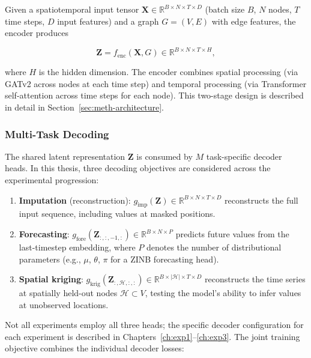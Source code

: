 Given a spatiotemporal input tensor $\mathbf{X} \in \mathbb{R}^{B \times N \times T \times D}$ (batch size $B$, $N$ nodes, $T$ time steps, $D$ input features) and a graph $G = (V, E)$ with edge features, the encoder produces

\begin{equation}
    \mathbf{Z} = f_{\text{enc}}(\mathbf{X}, G) \in \mathbb{R}^{B \times N \times T \times H},
    \label{eq:encoder-latent}
\end{equation}

\noindent where $H$ is the hidden dimension. The encoder combines spatial processing (via GATv2 across nodes at each time step) and temporal processing (via Transformer self-attention across time steps for each node). This two-stage design is described in detail in Section~\ref{sec:meth-architecture}.

\subsubsection{Multi-Task Decoding}

The shared latent representation $\mathbf{Z}$ is consumed by $M$ task-specific decoder heads. In this thesis, three decoding objectives are considered across the experimental progression:

\begin{enumerate}
    \item \textbf{Imputation} (reconstruction): $g_{\text{imp}}(\mathbf{Z}) \in \mathbb{R}^{B \times N \times T \times D}$ reconstructs the full input sequence, including values at masked positions.
    \item \textbf{Forecasting}: $g_{\text{fore}}(\mathbf{Z}_{:,:,-1,:}) \in \mathbb{R}^{B \times N \times P}$ predicts future values from the last-timestep embedding, where $P$ denotes the number of distributional parameters (e.g., $\mu$, $\theta$, $\pi$ for a ZINB forecasting head).
    \item \textbf{Spatial kriging}: $g_{\text{krig}}(\mathbf{Z}_{:,\mathcal{H},:,:}) \in \mathbb{R}^{B \times |\mathcal{H}| \times T \times D}$ reconstructs the time series at spatially held-out nodes $\mathcal{H} \subset V$, testing the model's ability to infer values at unobserved locations.
\end{enumerate}

\noindent Not all experiments employ all three heads; the specific decoder configuration for each experiment is described in Chapters~\ref{ch:exp1}--\ref{ch:exp3}. The joint training objective combines the individual decoder losses:

